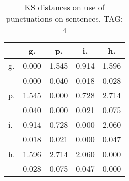 \begin{table}[h!]
\begin{center}
\begin{tabular}{| l | c | c | c | c |}\hline
 & g. & p. & i. & h. \\\hline
g. & 0.000  & 1.545  & 0.914  & 1.596 \\\hline
 & 0.000  & 0.040  & 0.018  & 0.028 \\\hline
p. & 1.545  & 0.000  & 0.728  & 2.714 \\\hline
 & 0.040  & 0.000  & 0.021  & 0.075 \\\hline
i. & 0.914  & 0.728  & 0.000  & 2.060 \\\hline
 & 0.018  & 0.021  & 0.000  & 0.047 \\\hline
h. & 1.596  & 2.714  & 2.060  & 0.000 \\\hline
 & 0.028  & 0.075  & 0.047  & 0.000 \\\hline
\end{tabular}
\caption{KS distances on use of punctuations on sentences. TAG: 4}
\end{center}
\end{table}